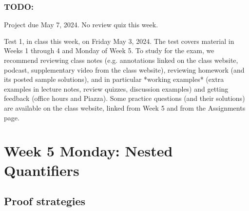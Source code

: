 \subsubsection*{TODO:}
\begin{list}
   {\itemsep2pt}
   \item Project due May 7, 2024. No review quiz this week.
   \item Test 1, in class this week, on Friday May 3, 2024.
   The test covers material in Weeks 1 through 4 and Monday of Week 5. 
   To study for the exam, we recommend reviewing class notes 
   (e.g. annotations linked on the class website, podcast, supplementary video from the class website), 
   reviewing homework (and its posted sample solutions), and in particular *working examples* 
   (extra examples in lecture notes, review quizzes, discussion examples) and getting feedback (office hours and Piazza).
   Some practice questions (and their solutions) are available on the class website, linked from Week 5 and from the Assignments page.
\end{list}

\newpage

\begin{comment}
Removed definition of insertion, deletion, mutation from Wednesday of Week 4 -- when do we need them?

\newpage



\end{comment}

\section*{Week 5 Monday: Nested Quantifiers}


\subsection*{Proof strategies}

%

\newpage


\newpage
